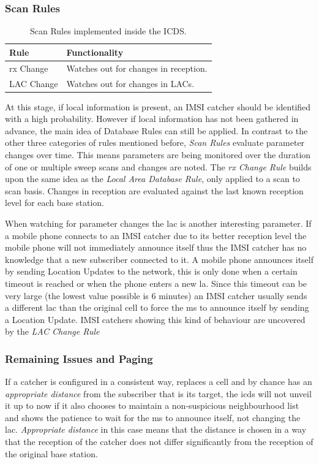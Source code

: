 \subsubsection{Scan Rules}
\begin{table}
\centering
\begin{tabular}{ll}
\toprule
Rule					&Functionality\\
\midrule
rx Change		 		&Watches out for changes in reception.\\
LAC Change				&Watches out for changes in LACs.\\
\bottomrule
\end{tabular}
\caption{Scan Rules implemented inside the ICDS.}
\label{tab:scan_rules}
\end{table}
At this stage, if local information is present, an IMSI catcher should be identified with a high probability.
However if local information has not been gathered in advance, the main idea of Database Rules can still be applied.
In contrast to the other three categories of rules mentioned before, \emph{Scan Rules} evaluate parameter changes over time.
This means parameters are being monitored over the duration of one or multiple sweep scans and changes are noted.
The \emph{rx Change Rule} builds upon the same idea as the \emph{Local Area Database Rule}, only applied to a scan to scan basis.
Changes in reception are evaluated against the last known reception level for each base station.

When watching for parameter changes the \gls{lac} is another interesting parameter.
If a mobile phone connects to an IMSI catcher due to its better reception level the mobile phone will not immediately announce itself thus the IMSI catcher has no knowledge that a new subscriber connected to it.
A mobile phone announces itself by sending Location Updates to the network, this is only done when a certain timeout is reached or when the phone enters a new \gls{la}.
Since this timeout can be very large (the lowest value possible is 6 minutes) an IMSI catcher usually sends a different \gls{lac} than the original cell to force the \gls{ms} to announce itself by sending a Location Update.
IMSI catchers showing this kind of behaviour are uncovered by the \emph{LAC Change Rule}

\subsubsection{Remaining Issues and Paging}
\label{sec:paging}
If a catcher is configured in a consistent way, replaces a cell and by chance has an \emph{appropriate distance} from the subscriber that is its target, the \gls{icds} will not unveil it up to now if it also chooses to maintain a non-suspicious neighbourhood list and shows the patience to wait for the \gls{ms} to announce itself, \eg not changing the \gls{lac}.
\emph{Appropriate distance} in this case means that the distance is chosen in a way that the reception of the catcher does not differ significantly from the reception of the original base station.

